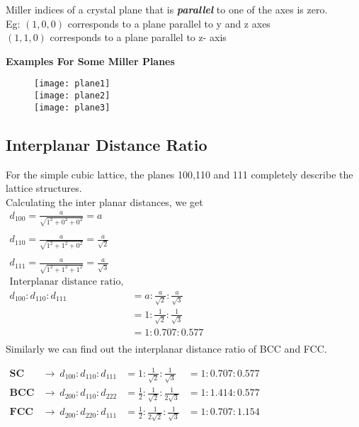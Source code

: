 \begin{note}
	Miller indices of a crystal plane that is \textbf{\textit{parallel}} to one of the axes is zero.\\
	Eg: $(1, 0, 0)$ corresponds to a plane parallel to y and z axes\\
	$(1, 1, 0)$ corresponds to a plane parallel to z- axis
\end{note}
\textbf{Examples For Some Miller Planes}

\begin{center}
	\begin{figure}[H]
		\texttt{[image: plane1]}\\
		\texttt{[image: plane2]}\\
		\texttt{[image: plane3]}
	\end{figure}
\end{center}

\newpage
\subsection {Interplanar Distance Ratio}
For the simple cubic lattice, the planes 100,110 and 111 completely describe the lattice structures.\\
Calculating the inter planar distances, we get\\
$\begin{aligned}
d_{100}= \frac{a}{\sqrt{1^{2}+0^{2}+0^{2}}}= a\\\\
d_{110}= \frac{a}{\sqrt{1^{2}+1^{2}+0^{2}}}= \frac{a}{\sqrt{2}}\\\\
d_{111}= \frac{a}{\sqrt{1^{2}+1^{2}+1^{2}}}= \frac{a}{\sqrt{3}}\\
\text {Interplanar distance ratio,}\\
d_{100}: d_{110}: d_{111} &= a: \frac{a}{\sqrt{2}}: \frac{a}{\sqrt{3}}\\
&= 1: \frac{1}{\sqrt{2}}: \frac{1}{\sqrt{3}}\\
&= 1: 0.707: 0.577\\
\end{aligned}$\\
Similarly we can find out the interplanar distance ratio of BCC and FCC.
\begin{eBox}
	$\begin{aligned}
	\textbf{SC} &\longrightarrow \ d_{100}: d_{110}: d_{111} &= 1: \frac{1}{\sqrt{2}}: \frac{1}{\sqrt{3}} &= 1: 0.707: 0.577\\
	\textbf{BCC} &\longrightarrow \ d_{200}: d_{110}: d_{222} &= \frac{1}{2}: \frac{1}{\sqrt{2}}: \frac{1}{2 \sqrt{3}} &= 1: 1.414: 0.577\\
	\textbf{FCC} &\longrightarrow \ d_{200}: d_{220}: d_{111} &= \frac{1}{2}: \frac{1}{2 \sqrt{2}}: \frac{1}{\sqrt{3}} &= 1: 0.707: 1.154
	\end{aligned}$
\end{eBox}
